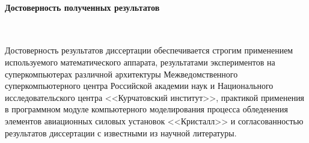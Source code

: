 \paragraph{Достоверность полученных результатов} \

Достоверность результатов диссертации обеспечивается строгим применением используемого математического аппарата, результатами экспериментов на суперкомпьютерах различной архитектуры Межведомственного суперкомпьютерного центра Российской академии наук и Национального исследовательского центра <<Курчатовский институт>>, практикой применения в программном модуле компьютерного моделирования процесса обледенения элементов авиационных силовых установок <<Кристалл>> и согласованно­стью результатов диссертации с известными из научной литературы.